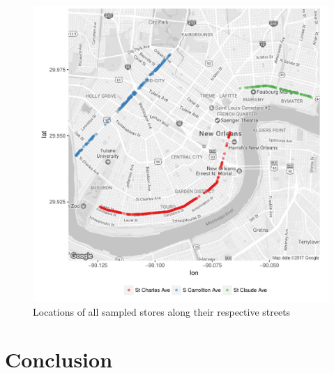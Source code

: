 \documentclass[11pt]{article}
\newcommand{\1}{\mathbf{1}}
\newcommand{\0}{\mathbf{0}}
\begin{document}
\begin{figure}[htp!]
	\centering
		\includegraphics[scale=0.75]{img/storemap.pdf}
	\caption{Locations of all sampled stores along their respective streets}
	\label{fig:storemap}
\end{figure}




\section{Conclusion}\label{Conclusion}







{}

% 
% 
\end{document}
